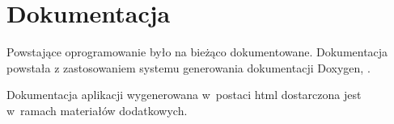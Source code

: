 \section{Dokumentacja}
Powstające oprogramowanie było na bieżąco dokumentowane. Dokumentacja powstała z zastosowaniem systemu generowania dokumentacji \textsf{Doxygen}, \cite{website:doxygen}.

Dokumentacja aplikacji wygenerowana w~postaci \textsf{html} dostarczona jest w~ramach materiałów dodatkowych.

